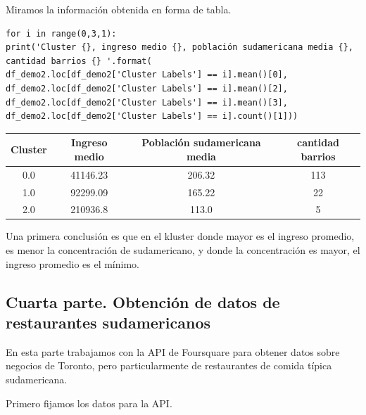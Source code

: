 \documentclass[10pt,a4paper,arial, spanish]{article}
\begin{document}
Miramos la información obtenida en forma de tabla.

\begin{verbatim}
for i in range(0,3,1):
print('Cluster {}, ingreso medio {}, población sudamericana media {}, cantidad barrios {} '.format(
df_demo2.loc[df_demo2['Cluster Labels'] == i].mean()[0], df_demo2.loc[df_demo2['Cluster Labels'] == i].mean()[2],
df_demo2.loc[df_demo2['Cluster Labels'] == i].mean()[3], df_demo2.loc[df_demo2['Cluster Labels'] == i].count()[1]))
\end{verbatim}
\begin{tabular}{|c|c|c|c|}
	\hline
	Cluster & Ingreso medio & Población sudamericana media  & cantidad barrios  \\
	\hline    
	0.0 & 41146.23 & 206.32   & 113  \\
	\hline
	1.0 & 92299.09 & 165.22   & 22  \\
	\hline
	2.0 & 210936.8 & 113.0 & 5   \\
	\hline

\end{tabular}

Una primera conclusión es que en el kluster donde mayor es el ingreso promedio, es menor la concentración de sudamericano, y donde la concentración es mayor, el ingreso promedio es el mínimo.

\subsection{Cuarta parte. Obtención de datos de restaurantes sudamericanos }
En esta parte trabajamos con la API de Foursquare para obtener datos sobre negocios de Toronto, pero particularmente de restaurantes de comida típica sudamericana.

Primero fijamos los datos para la API. 
\end{document}
